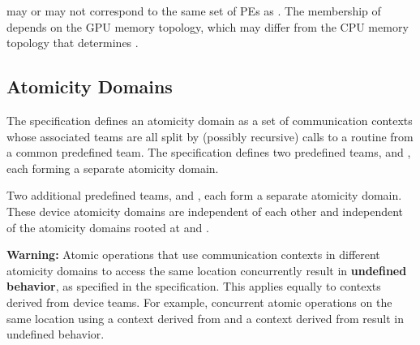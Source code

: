  may or may not correspond to the same set of
\acp{PE} as . The membership of
 depends on the \ac{GPU} memory topology,
which may differ from the CPU memory topology that determines
.

\subsection{Atomicity Domains}\label{subsec:atomicity_domains}

The  specification defines an atomicity domain as a set of
communication contexts whose associated teams are all split by (possibly
recursive) calls to a  routine from a common
predefined team. The  specification defines two predefined teams,
 and , each forming a
separate atomicity domain.

Two additional predefined teams,  and
, each form a separate atomicity domain.
These device atomicity domains are independent of each other and independent of
the atomicity domains rooted at  and
.

\textbf{Warning:} Atomic operations that use communication contexts in different
atomicity domains to access the same location concurrently result in
\textbf{undefined behavior}, as specified in the \openshmem specification. This
applies equally to contexts derived from device teams. For example, concurrent
atomic operations on the same location using a context derived from
 and a context derived from
 result in undefined behavior.

